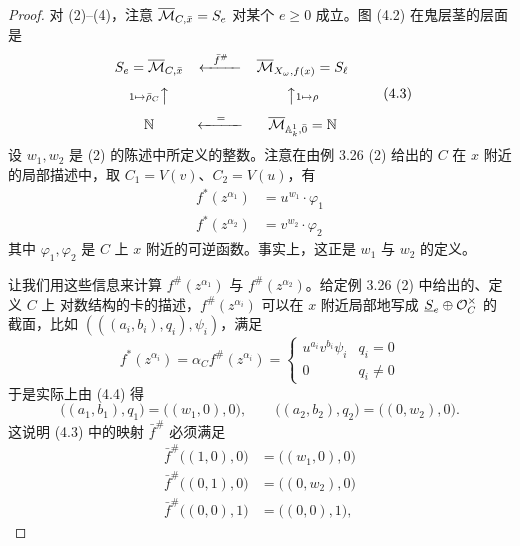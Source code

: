 \begin{proof}
对 (2)–(4)，注意 $\overline{\mathcal{M}}_{C,\bar x} = S_e$ 对某个 $e\ge0$ 成立。图 (4.2) 在鬼层茎的层面是
\begin{equation}
\begin{array}{ccc}
S_e = \overline{\mathcal{M}}_{C,\bar x} & \xleftarrow{\ \ \bar f^{\#}\ \ } & \overline{\mathcal{M}}_{X_\omega,f(x)} = S_\ell \\[8pt]
{\scriptstyle 1\mapsto\bar\rho_C}\big\uparrow & & \big\uparrow{\scriptstyle 1\mapsto\rho} \\[8pt]
\mathbb{N} & \xleftarrow{\ \ \ =\ \ \ } & \overline{\mathcal{M}}_{\mathbb{A}^1_{k},\bar 0} = \mathbb{N}
\end{array}
\tag{4.3}
\end{equation}
设 $w_1,w_2$ 是 (2) 的陈述中所定义的整数。注意在由例 3.26 (2) 给出的 $C$ 在 $x$ 附近的局部描述中，取
$C_1 = V(v)$、$C_2 = V(u)$，有
\begin{equation}
\begin{aligned}
f^*(z^{\alpha_1}) &= u^{w_1}\cdot\varphi_1\\
f^*(z^{\alpha_2}) &= v^{w_2}\cdot\varphi_2
\end{aligned}
\tag{4.4}
\end{equation}
其中 $\varphi_1,\varphi_2$ 是 $C$ 上 $x$ 附近的可逆函数。事实上，这正是 $w_1$ 与 $w_2$ 的定义。

让我们用这些信息来计算 $f^{\#}(z^{\alpha_1})$ 与 $f^{\#}(z^{\alpha_2})$。给定例 3.26 (2) 中给出的、定义 $C$ 上
对数结构的卡的描述，$f^{\#}(z^{\alpha_i})$ 可以在 $x$ 附近局部地写成 $\underline{S}_e\oplus\mathcal{O}_C^{\times}$ 的
截面，比如 $(((a_i,b_i),q_i),\psi_i)$，满足
\[
f^*(z^{\alpha_i}) = \alpha_C f^{\#}(z^{\alpha_i}) =
\begin{cases}
u^{a_i}v^{b_i}\psi_i & q_i = 0\\
0 & q_i \ne 0
\end{cases}
\]
于是实际上由 (4.4) 得
\[
\bigl((a_1,b_1),q_1\bigr) = \bigl((w_1,0),0\bigr),\qquad
\bigl((a_2,b_2),q_2\bigr) = \bigl((0,w_2),0\bigr).
\]
这说明 (4.3) 中的映射 $\bar f^{\#}$ 必须满足
\begin{equation}
\begin{aligned}
\bar f^{\#}\bigl((1,0),0\bigr) &= \bigl((w_1,0),0\bigr)\\
\bar f^{\#}\bigl((0,1),0\bigr) &= \bigl((0,w_2),0\bigr)\\
\bar f^{\#}\bigl((0,0),1\bigr) &= \bigl((0,0),1\bigr),
\end{aligned}
\tag{4.5}
\end{equation}



\end{proof}
